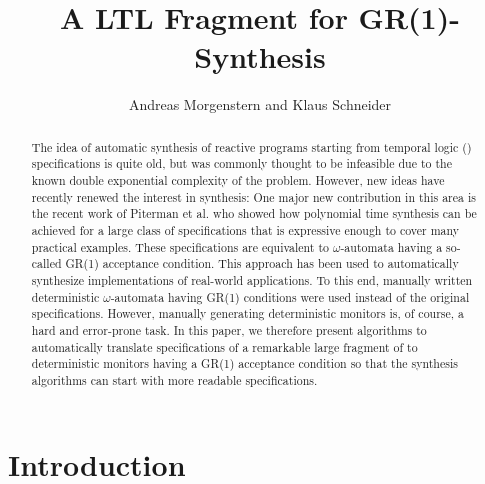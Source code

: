 \documentclass[submission,copyright,creativecommons]{eptcs}
\begin{document}
\title{A LTL Fragment for GR(1)-Synthesis}

\author{Andreas Morgenstern and Klaus Schneider
}
\def\titlerunning{A LTL Fragment for GR(1)-Synthesis}

\def\authorrunning{A. Morgenstern and K. Schneider}

\newtheorem{definition}{Definition}
\newtheorem{proposition}{Proposition}
\newtheorem{lemma}{Lemma}
\newtheorem{theorem}{Theorem}
\newtheorem{corollary}{Corollary}
\newtheorem{remark}{Remark}
\newtheorem{example}{Example}
\def\qed{\hfill \rule{2mm}{2mm}}


\maketitle

\begin{abstract}
The idea of automatic synthesis of reactive programs starting from temporal logic (\LTL{}) specifications is quite old, but was commonly thought to be infeasible due to the known double exponential complexity of the problem. However, new ideas have recently renewed the interest in \LTL{} synthesis: One major new contribution in this area is the recent work of Piterman et al. who showed how polynomial time synthesis can be achieved for a large class of \LTL{} specifications that is expressive enough to cover many practical examples. These \LTL{} specifications are equivalent to $\omega$-automata having a so-called GR(1) acceptance condition. This approach has been used to automatically synthesize implementations of real-world applications. To this end, manually written deterministic $\omega$-automata having GR(1) conditions were used instead of the original \LTL{} specifications. However, manually generating deterministic monitors is, of course, a hard and error-prone task. In this paper, we therefore present algorithms to automatically translate specifications of a remarkable large fragment of \LTL{} to deterministic monitors having a GR(1) acceptance condition so that the synthesis algorithms can start with more readable \LTL{} specifications.
\end{abstract}


\section{Introduction}
\end{document}

